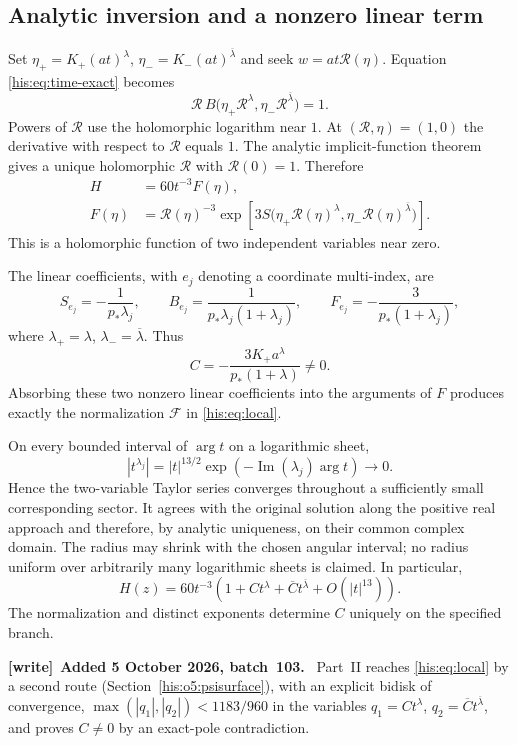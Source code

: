 \documentclass[11pt]{article}
\theoremstyle{remark}\newtheorem{remark}[theorem]{Remark}
\DeclareMathOperator{\Ima}{Im}
\newcommand{\la}{\lambda}
\newcommand{\lab}{{\overline{\lambda}}}
\numberwithin{equation}{section}
\newenvironment{writenote}[1][]{\par\smallskip\begingroup\small
 \noindent\textbf{[write]}\if\relax\detokenize{#1}\relax\else~\textbf{#1.}\fi\ }%
 {\par\endgroup\smallskip}
\begin{document}
\subsection{Analytic inversion and a nonzero linear term}
Set $\eta_+=K_+(at)^\la$, $\eta_-=K_-(at)^\lab$ and seek $w=at\mathcal R(\eta)$. Equation \eqref{his:eq:time-exact} becomes
\begin{equation}\label{his:eq:implicit}
 \mathcal R\,B\bigl(\eta_+\mathcal R^\la,\eta_-\mathcal R^\lab\bigr)=1.
\end{equation}
Powers of $\mathcal R$ use the holomorphic logarithm near $1$. At $(\mathcal R,\eta)=(1,0)$ the derivative with respect to $\mathcal R$ equals $1$. The analytic implicit-function theorem gives a unique holomorphic $\mathcal R$ with $\mathcal R(0)=1$. Therefore
\begin{align}
 H&=60t^{-3}F(\eta),\label{his:eq:Fraw}\\
 F(\eta)&=\mathcal R(\eta)^{-3}
 \exp\!\left[3S\bigl(\eta_+\mathcal R(\eta)^\la,
                         \eta_-\mathcal R(\eta)^\lab\bigr)\right].\nonumber
\end{align}
This is a holomorphic function of two independent variables near zero.

The linear coefficients, with $e_j$ denoting a coordinate multi-index, are
\begin{equation}\label{his:eq:linearcoeff}
 S_{e_j}=-\frac1{p_*\la_j},\qquad
 B_{e_j}=\frac1{p_*\la_j(1+\la_j)},\qquad
 F_{e_j}=-\frac3{p_*(1+\la_j)},
\end{equation}
where $\la_+=\la$, $\la_-=\lab$. Thus
\begin{equation}\label{his:eq:Cnonzero}
 C=-\frac{3K_+a^\la}{p_*(1+\la)}\ne0.
\end{equation}
Absorbing these two nonzero linear coefficients into the arguments of $F$ produces exactly the normalization $\mathcal F$ in \eqref{his:eq:local}.

On every bounded interval of $\arg t$ on a logarithmic sheet,
\[
 |t^{\la_j}|=|t|^{13/2}\exp(-\Ima(\la_j)\arg t)\longrightarrow0.
\]
Hence the two-variable Taylor series converges throughout a sufficiently small corresponding sector. It agrees with the original solution along the positive real approach and therefore, by analytic uniqueness, on their common complex domain. The radius may shrink with the chosen angular interval; no radius uniform over arbitrarily many logarithmic sheets is claimed. In particular,
\begin{equation}\label{his:eq:first-local}
 H(z)=60t^{-3}\left(1+Ct^\la+\overline C t^\lab+O(|t|^{13})\right).
\end{equation}
The normalization and distinct exponents determine $C$ uniquely on the specified branch.
\begin{writenote}[Added 5 October 2026, batch~103]
Part~II reaches \eqref{his:eq:local} by a second route (Section~\ref{his:o5:psisurface}), with an explicit bidisk of convergence, $\max(|q_1|,|q_2|)<1183/960$ in the variables $q_1=Ct^\la$, $q_2=\overline Ct^\lab$, and proves $C\ne0$ by an exact-pole contradiction.
\end{writenote}
\end{document}
